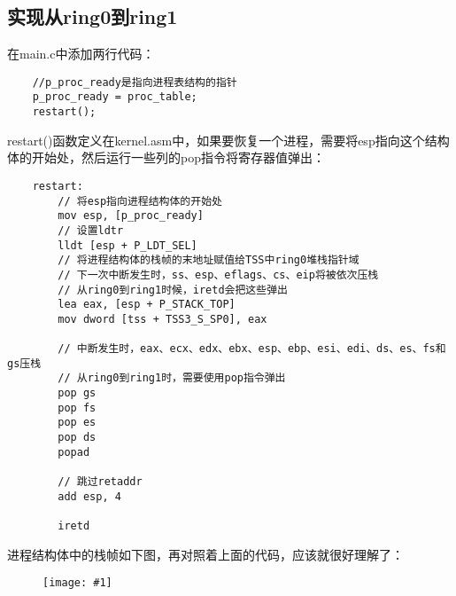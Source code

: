 \documentclass[a4paper,left=2.5cm,right=2.5cm,11pt]{report}
\newcommand{\fic}[1]{\begin{figure}[H]
		\center
		\texttt{[image: \#1]}
	\end{figure}}
\begin{document}
\subsection{实现从ring0到ring1}
	在main.c中添加两行代码：
	\begin{lstlisting}
	//p_proc_ready是指向进程表结构的指针
	p_proc_ready = proc_table;
	restart();
	\end{lstlisting}

	restart()函数定义在kernel.asm中，如果要恢复一个进程，需要将esp指向这个结构体的开始处，然后运行一些列的pop指令将寄存器值弹出：
	\begin{lstlisting}
	restart:
		// 将esp指向进程结构体的开始处
		mov esp, [p_proc_ready]
		// 设置ldtr
		lldt [esp + P_LDT_SEL]
		// 将进程结构体的栈帧的末地址赋值给TSS中ring0堆栈指针域
		// 下一次中断发生时，ss、esp、eflags、cs、eip将被依次压栈
		// 从ring0到ring1时候，iretd会把这些弹出
		lea eax, [esp + P_STACK_TOP]
		mov dword [tss + TSS3_S_SP0], eax

		// 中断发生时，eax、ecx、edx、ebx、esp、ebp、esi、edi、ds、es、fs和gs压栈
		// 从ring0到ring1时，需要使用pop指令弹出
		pop gs
		pop fs
		pop es
		pop ds
		popad

		// 跳过retaddr
		add esp, 4

		iretd
	\end{lstlisting}

	进程结构体中的栈帧如下图，再对照着上面的代码，应该就很好理解了：
	\fic{3.png}
	
\end{document}
